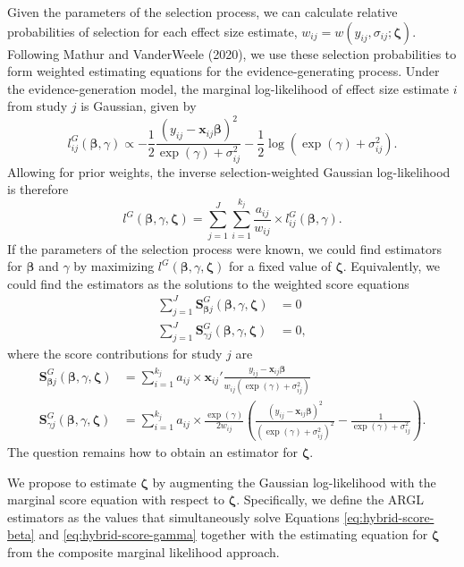 \documentclass[
  man, donotrepeattitle,floatsintext]{apa7}
\begin{document}
Given the parameters of the selection process, we can calculate relative probabilities of selection for each effect size estimate, \(w_{ij} = w(y_{ij}, \sigma_{ij}; \boldsymbol\zeta)\). Following Mathur and VanderWeele (2020), we use these selection probabilities to form weighted estimating equations for the evidence-generating process. Under the evidence-generation model, the marginal log-likelihood of effect size estimate \(i\) from study \(j\) is Gaussian, given by
\[
l^G_{ij}(\boldsymbol\beta, \gamma) \propto - \frac{1}{2}\frac{(y_{ij} - \mathbf{x}_{ij} \boldsymbol\beta)^2}{\exp(\gamma) + \sigma_{ij}^2} - \frac{1}{2}\log(\exp(\gamma) + \sigma_{ij}^2).
\]
Allowing for prior weights, the inverse selection-weighted Gaussian log-likelihood is therefore
\[
l^G(\boldsymbol\beta, \gamma, \boldsymbol\zeta) = \sum_{j=1}^J \sum_{i=1}^{k_j} \frac{a_{ij}} {w_{ij}} \times l^G_{ij}(\boldsymbol\beta, \gamma).
\]
If the parameters of the selection process were known, we could find estimators for \(\boldsymbol\beta\) and \(\gamma\) by maximizing \(l^G(\boldsymbol\beta, \gamma, \boldsymbol\zeta)\) for a fixed value of \(\boldsymbol\zeta\).
Equivalently, we could find the estimators as the solutions to the weighted score equations
\begin{align}
\sum_{j=1}^J \mathbf{S}^G_{\boldsymbol\beta j} (\boldsymbol\beta, \gamma, \boldsymbol\zeta) &= 0 \label{eq:hybrid-score-beta} \\
\sum_{j=1}^J \mathbf{S}^G_{\gamma j} (\boldsymbol\beta, \gamma, \boldsymbol\zeta) &= 0, \label{eq:hybrid-score-gamma}
\end{align}
where the score contributions for study \(j\) are
\begin{align}
\mathbf{S}^G_{\boldsymbol\beta j} (\boldsymbol\beta, \gamma, \boldsymbol\zeta) &= \sum_{i=1}^{k_j} a_{ij} \times \mathbf{x}_{ij}' \frac{y_{ij} - \mathbf{x}_{ij} \boldsymbol\beta}{w_{ij} \left(\exp(\gamma) + \sigma_{ij}^2\right)} \\
\mathbf{S}^G_{\gamma j} (\boldsymbol\beta, \gamma, \boldsymbol\zeta) &= \sum_{i=1}^{k_j} a_{ij} \times \frac{\exp(\gamma)}{2 w_{ij}} \left(\frac{(y_{ij} -\mathbf{x}_{ij} \boldsymbol\beta)^2}{\left(\exp(\gamma) + \sigma_{ij}^2\right)^2} - \frac{1}{\exp(\gamma) + \sigma_{ij}^2}\right).
\end{align}
The question remains how to obtain an estimator for \(\boldsymbol\zeta\).

We propose to estimate \(\boldsymbol\zeta\) by augmenting the Gaussian log-likelihood with the marginal score equation with respect to \(\boldsymbol\zeta\).
Specifically, we define the ARGL estimators as the values that simultaneously solve Equations \eqref{eq:hybrid-score-beta} and \eqref{eq:hybrid-score-gamma} together with the estimating equation for \(\boldsymbol\zeta\) from the composite marginal likelihood approach.
\end{document}
